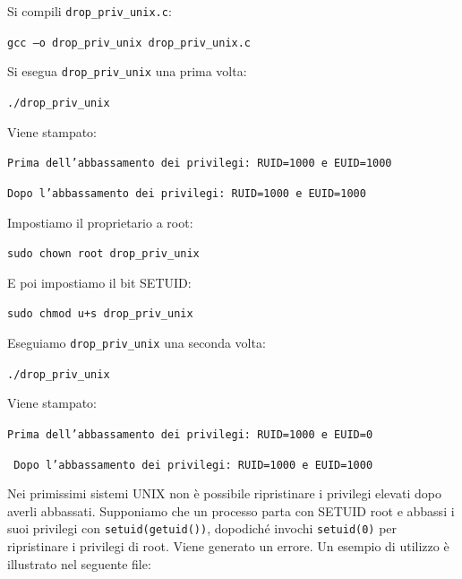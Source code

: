 Si compili \texttt{drop\_priv\_unix.c}:
\begin{center}
    \texttt{gcc –o drop\_priv\_unix drop\_priv\_unix.c}
\end{center}

Si esegua \texttt{drop\_priv\_unix} una prima volta:
\begin{center}
    \texttt{./drop\_priv\_unix}
\end{center}

Viene stampato:

\texttt{Prima dell’abbassamento dei privilegi:
 RUID=1000 e EUID=1000}
 
 \texttt{Dopo l’abbassamento dei privilegi:
 RUID=1000 e EUID=1000}
 
Impostiamo il proprietario a root:
\begin{center}
    \texttt{sudo chown root drop\_priv\_unix}
\end{center}
E poi impostiamo il bit SETUID:
\begin{center}
    \texttt{sudo chmod u+s drop\_priv\_unix}
\end{center}
Eseguiamo \texttt{drop\_priv\_unix} una seconda volta:
\begin{center}
    \texttt{./drop\_priv\_unix}
\end{center}

Viene stampato:

\texttt{Prima dell’abbassamento dei privilegi:
 RUID=1000 e EUID=0}
 
 \texttt{ Dopo l’abbassamento dei privilegi:
 RUID=1000 e EUID=1000}
 
\vspace{5mm}
 
 
Nei primissimi sistemi UNIX non è possibile ripristinare i privilegi elevati dopo averli abbassati. Supponiamo che un processo parta con SETUID root e abbassi i suoi privilegi con \texttt{setuid(getuid())}, dopodiché invochi \texttt{setuid(0)} per ripristinare i privilegi di root. Viene generato un errore. Un esempio di utilizzo è illustrato nel seguente file:

